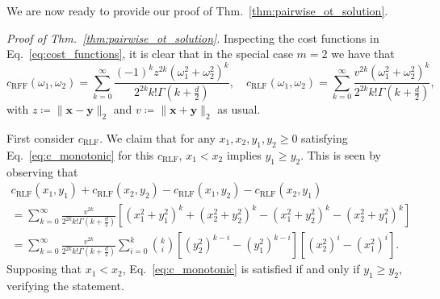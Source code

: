 We are now ready to provide our proof of Thm.~\ref{thm:pairwise_ot_solution}.

\emph{Proof of Thm.~\ref{thm:pairwise_ot_solution}}. 
Inspecting the cost functions in Eq.~\ref{eq:cost_functions}, it is clear that in the special case $m=2$ we have that 
\begin{equation} \label{eq:mis2_cost_functions}
    c_\textrm{RFF}(\omega_1, \omega_2) = \sum_{k=0}^\infty \frac{(-1)^k z^{2k} \left( \omega_1^2 + \omega_2^2 \right)^k}{2^{2k} k! \Gamma(k+\frac{d}{2})},  \quad c_\textrm{RLF}(\omega_1, \omega_2) = \sum_{k=0}^\infty \frac{v^{2k} (\omega_1^2 + \omega_2^2) ^{k}}{2^{2k} k! \Gamma(k+\frac{d}{2})}, 
\end{equation}
with $z \coloneqq \|\boldsymbol{x} - \boldsymbol{y}\|_2$ and $v \coloneqq \|\boldsymbol{x} + \boldsymbol{y}\|_2$ as usual.

First consider $c_\textrm{RLF}$. 
We claim that for any $x_1,x_2,y_1,y_2 \geq 0$ satisfying Eq.~\ref{eq:c_monotonic} for this $c_\textrm{RLF}$, $x_1 < x_2$ implies $y_1 \geq y_2$. This is seen by observing that
\begin{equation} \label{eq:c_monotone_expansion}
\begin{multlined}
    c_\textrm{RLF}(x_1,y_1)+c_\textrm{RLF}(x_2,y_2) - c_\textrm{RLF}(x_1,y_2) - c_\textrm{RLF}(x_2,y_1)
    \\ =  \sum_{k=0}^\infty \frac{v^{2k}}{2^{2k}k!\Gamma(k+\frac{d}{2})} \left [ (x_1^2+y_1^2)^k + (x_2^2+y_2^2)^k - (x_1^2+y_2^2)^k - (x_2^2+y_1^2)^k\right]
    \\ = \sum_{k=0}^\infty \frac{v^{2k}}{2^{2k}k!\Gamma(k+\frac{d}{2})} \sum_{i=0}^k {k \choose i} \left[ (y_2^2)^{k-i} - (y_1^2)^{k-i} 
   \right ] \left [ (x_2^2)^i - (x_1^2)^i \right].
\end{multlined}
\end{equation}
Supposing that $x_1 < x_2$, Eq.~\ref{eq:c_monotonic} is satisfied if and only if $y_1 \geq y_2$, verifying the statement. 


